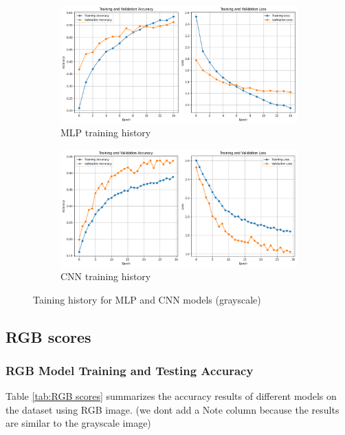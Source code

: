 \documentclass{article}
\begin{document}
\begin{figure}[H]
    \centering
    \begin{subfigure}[b]{0.48\textwidth}
        \includegraphics[width=\textwidth]{assets/confusion_matrix/grayscale/MLP_history.png}
        \caption{MLP training history}
    \end{subfigure}
    \hfill
    \begin{subfigure}[b]{0.48\textwidth}
        \includegraphics[width=\textwidth]{assets/confusion_matrix/grayscale/CNN_history.png}
        \caption{CNN training history}
    \end{subfigure}
    \caption{Taining history for MLP and CNN models (grayscale)}
    \label{fig:grayscale_training_history}
\end{figure}


\FloatBarrier 
\newpage
\subsection{RGB scores}
\subsubsection{RGB Model Training and Testing Accuracy}
Table \ref{tab:RGB scores} summarizes the accuracy results of different models on the dataset using RGB image. (we dont add a Note column because the results are similar to the grayscale image)
\end{document}
